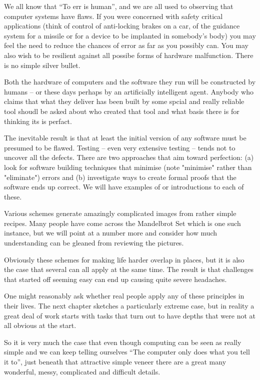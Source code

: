 \begin{longdescription}
\item[Cope with the inevitability of human error]
We all know that ``To err is human'', and we are all used to observing that
computer systems have flaws. If you were concerned with safety critical
applications (think of control of anti-locking brakes on a car, of
the guidance system for a missile or for a device to be implanted in
somebody's body) you may feel the need to reduce the chances of error
as far as you possibly can. You may also wish to be resilient against
all possibe forms of hardware malfunction. There is no simple silver
bullet.

Both the hardware of computers and the software they run will be
constructed by humans -- or these days perhaps by an artificially
intelligent agent. Anybody who claims that what they deliver has been
built by some spcial and really reliable tool shoudl be asked about
who created that tool and what basis there is for thinking its is perfact.

The inevitable result is that at least the initial version of any software
must be presumed to be flawed. Testing -- even very extensive testing --
tends not to uncover all the defects. There are two approaches that aim
toward perfection: (a) look for software building techniques that minimise
(note  "minimise" rather than "eliminate") errors and (b) investigate ways
to create formal proofs that the software ends up correct. We will have 
examples of or introductions to each of these.


\item[Make sense of abstract graphical presentations]
Various schemes generate amazingly complicated images from rather 
simple recipes. Many people have come across the Mandelbrot Set which is 
one such instance, but we will point at a number more and consider how 
much understanding can be gleaned from reviewing the pictures.

\end{longdescription}

Obviously these schemes for making life harder overlap in places, but it
is also the case that several can all apply at the same time. The result
is that challenges that started off seeming easy can end up causing quite
severe headaches.

One might reasonably ask whether real people apply any of these
principles in their lives. The next chapter sketches a particularly
extreme case, but in reality a great deal of work starts with tasks
that turn out to have depths that were not at all obvious at the start.

So it is very much the case that even though computing can be seen as
really simple and we can keep telling ourselves ``The computer only
does what you tell it to'', just beneath that attractive simple veneer
there are a great many wonderful, messy, complicated and difficult details.




